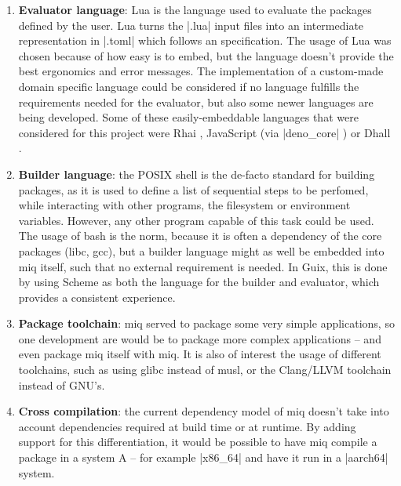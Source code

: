 \begin{enumerate}
    \item \textbf{Evaluator language}: Lua is the language
    used to evaluate the packages defined by the user. Lua
    turns the |.lua| input files into an intermediate
    representation in |.toml| which follows an
    specification. The usage of Lua was chosen because of
    how easy is to embed, but the language doesn't provide
    the best ergonomics and error messages. The
    implementation of a custom-made domain specific language
    could be considered if no language fulfills the
    requirements needed for the evaluator, but also some
    newer languages are being developed. Some of these
    easily-embeddable languages that were
    considered for this project were Rhai
    \cite{RhaiEmbeddedScripting}, JavaScript (via
    |deno_core| \cite{DenoCoreCrates2023}) or Dhall \cite{DhallConfigurationLanguage}.

    \item \textbf{Builder language}: the POSIX shell is the
    de-facto standard for building packages, as it is used
    to define a list of sequential steps to be perfomed,
    while interacting with other programs, the filesystem or
    environment variables. However, any other program
    capable of this task could be used. The usage of bash is
    the norm, because it is often a dependency of the core
    packages (libc, gcc), but a builder language might as
    well be embedded into miq itself, such that no external
    requirement is needed. In Guix, this is done by using
    Scheme as both the language for the builder and
    evaluator, which provides a consistent experience.

    \item \textbf{Package toolchain}: miq served to package
    some very simple applications, so one development are
    would be to package more complex applications -- and
    even package miq itself with miq. It is also of interest
    the usage of different toolchains, such as using glibc
    instead of musl, or the Clang/LLVM toolchain instead of GNU's.

    \item \textbf{Cross compilation}: the current dependency
    model of miq doesn't take into account dependencies
    required at build time or at runtime. By adding support
    for this differentiation, it would be possible to have
    miq compile a package in a system A -- for example
    |x86_64| and have it run in a |aarch64| system.


\end{enumerate}
